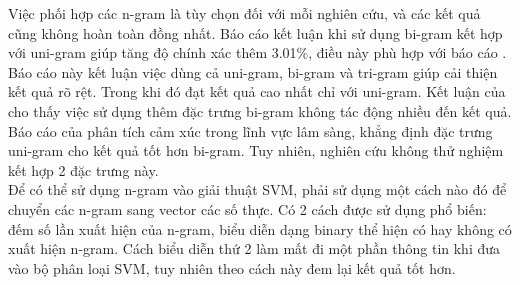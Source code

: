 Việc phối hợp các n-gram là tùy chọn đối với mỗi nghiên cứu, và các kết quả cũng không hoàn toàn đồng nhất. Báo cáo \cite{niu2005analysis} kết luận khi sử dụng bi-gram kết hợp với uni-gram giúp tăng độ chính xác thêm 3.01\%, điều này phù hợp với báo cáo \cite{sarker2011outcome}. Báo cáo này kết luận việc dùng cả uni-gram, bi-gram và tri-gram giúp cải thiện kết quả rõ rệt. Trong khi đó \cite{pang2002thumbs} đạt kết quả cao nhất chỉ với uni-gram. Kết luận của \cite{pang2002thumbs} cho thấy việc sử dụng thêm đặc trưng bi-gram không tác động nhiều đến kết quả. Báo cáo của \cite{smith2012cross} phân tích cảm xúc trong lĩnh vực lâm sàng, khẳng định đặc trưng uni-gram cho kết quả tốt hơn bi-gram. Tuy nhiên, nghiên cứu không thử nghiệm kết hợp 2 đặc trưng này.\\

Để có thể sử dụng n-gram vào giải thuật SVM, phải sử dụng một cách nào đó để chuyển các n-gram sang vector các số thực. Có 2 cách được sử dụng phổ biến: đếm số lần xuất hiện của n-gram, biểu diễn dạng binary thể hiện có hay không có xuất hiện n-gram. Cách biểu diễn thứ 2 làm mất đi một phần thông tin khi đưa vào bộ phân loại SVM, tuy nhiên theo \cite{pang2002thumbs} cách này đem lại kết quả tốt hơn. 